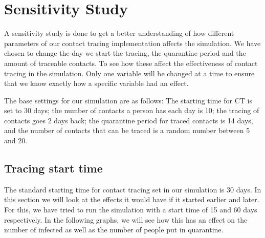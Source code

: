 \section{Sensitivity Study} \label{sec: Sensitivity Study}
A sensitivity study is done to get a better understanding of how different parameters of our contact tracing implementation affects the simulation. We have chosen to change the day we start the tracing, the quarantine period and the amount of traceable contacts. To see how these affect the effectiveness of contact tracing in the simulation. Only one variable will be changed at a time to ensure that we know exactly how a specific variable had an effect.

The base settings for our simulation are as follows: The starting time for CT is set to 30 days; the number of contacts a person has each day is 10; the tracing of contacts goes 2 days back; the quarantine period for traced contacts is 14 days, and the number of contacts that can be traced is a random number between 5 and 20. 

\subsection{Tracing start time}
The standard starting time for contact tracing set in our simulation is 30 days. In this section we will look at the effects it would have if it started earlier and later. For this, we have tried to run the simulation with a start time of 15 and 60 days respectively. In the following graphs, we will see how this has an effect on the number of infected as well as the number of people put in quarantine.

